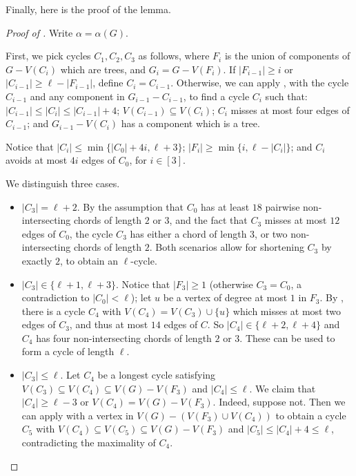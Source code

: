 \documentclass[11pt,english]{article}
\theoremstyle{plain}
\theoremstyle{definition}
\theoremstyle{remark}
\begin{document}
		Finally, here is the proof of the lemma.

		\begin{proof}[Proof of ]
			Write $\alpha = \alpha(G)$.

			First, we pick cycles $C_1, C_2, C_3$ as follows, where $F_i$ is the union of components of $G - V(C_i)$ which are trees, and $G_i = G - V(F_i)$. 
			If $|F_{i-1}| \ge i$ or $|C_{i-1}| \ge \ell - |F_{i-1}|$, define $C_i = C_{i-1}$. Otherwise, we can apply , with the cycle $C_{i-1}$ and any component in $G_{i-1} - C_{i-1}$, to find a cycle $C_i$ such that: $|C_{i-1}| \le |C_i| \le |C_{i-1}| + 4$; $V(C_{i-1}) \subseteq V(C_i)$; $C_i$ misses at most four edges of $C_{i-1}$; and $G_{i-1} - V(C_i)$ has a component which is a tree. 

			Notice that $|C_i| \le \min\{|C_0| + 4i, \ell + 3\}$; $|F_i| \ge \min\{i, \ell - |C_i|\}$; and $C_i$ avoids at most $4i$ edges of $C_0$, for $i \in [3]$.

			We distinguish three cases.
			\begin{itemize}
				\item
					$|C_3| = \ell + 2$. By the assumption that $C_0$ has at least $18$ pairwise non-intersecting chords of length $2$ or $3$, and the fact that $C_3$ misses at most $12$ edges of $C_0$, the cycle $C_3$ has either a chord of length $3$, or two non-intersecting chords of length $2$. Both scenarios allow for shortening $C_3$ by exactly $2$, to obtain an $\ell$-cycle.
				\item
					$|C_3| \in \{\ell + 1, \ell + 3\}$. Notice that $|F_3| \ge 1$ (otherwise $C_3 = C_0$, a contradiction to $|C_0| < \ell$); let $u$ be a vertex of degree at most $1$ in $F_3$. By , there is a cycle $C_4$ with $V(C_4) = V(C_3) \cup \{u\}$ which misses at most two edges of $C_3$, and thus at most $14$ edges of $C$. So $|C_4| \in \{\ell + 2, \ell + 4\}$ and $C_4$ has four non-intersecting chords of length $2$ or $3$. These can be used to form a cycle of length $\ell$.
				\item
					$|C_3| \le \ell$.
					Let $C_4$ be a longest cycle satisfying $V(C_3) \subseteq V(C_4) \subseteq V(G) - V(F_3)$ and $|C_4| \le \ell$.
					We claim that $|C_4| \ge \ell - 3$ or $V(C_4) = V(G) - V(F_3)$.  
					Indeed, suppose not. Then we can apply  with a vertex in $V(G) - (V(F_3) \cup V(C_4))$ to obtain a cycle $C_5$ with $V(C_4) \subseteq V(C_5) \subseteq V(G) - V(F_3)$ and $|C_5| \le |C_4| + 4 \le \ell$, contradicting the maximality of $C_4$.


\end{itemize}
\end{proof}
\end{document}
